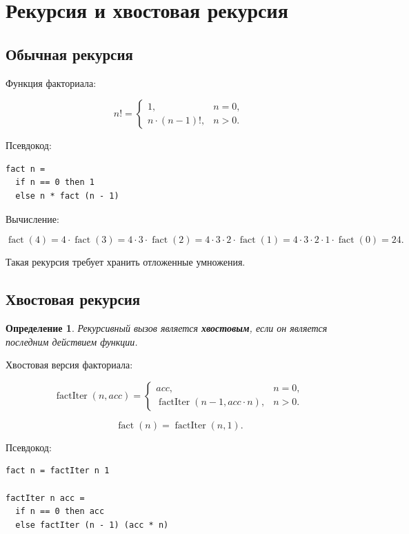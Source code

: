 \documentclass[12pt,a4paper]{article}
\newtheorem{definition}{Определение}
\begin{document}
\section{Рекурсия и хвостовая рекурсия}

\subsection{Обычная рекурсия}

Функция факториала:

\[
n! =
\begin{cases}
1, & n = 0, \\
n \cdot (n-1)!, & n > 0.
\end{cases}
\]

Псевдокод:

\begin{lstlisting}
fact n =
  if n == 0 then 1
  else n * fact (n - 1)
\end{lstlisting}

Вычисление:

\[
\operatorname{fact}(4)
=
4 \cdot \operatorname{fact}(3)
=
4 \cdot 3 \cdot \operatorname{fact}(2)
=
4 \cdot 3 \cdot 2 \cdot \operatorname{fact}(1)
=
4 \cdot 3 \cdot 2 \cdot 1 \cdot \operatorname{fact}(0)
=
24.
\]

Такая рекурсия требует хранить отложенные умножения.

\subsection{Хвостовая рекурсия}

\begin{definition}
Рекурсивный вызов является \textbf{хвостовым}, если он является последним действием функции.
\end{definition}

Хвостовая версия факториала:

\[
\operatorname{factIter}(n, acc) =
\begin{cases}
acc, & n = 0, \\
\operatorname{factIter}(n-1, acc \cdot n), & n > 0.
\end{cases}
\]

\[
\operatorname{fact}(n) = \operatorname{factIter}(n,1).
\]

Псевдокод:

\begin{lstlisting}
fact n = factIter n 1

factIter n acc =
  if n == 0 then acc
  else factIter (n - 1) (acc * n)
\end{lstlisting}
\end{document}
